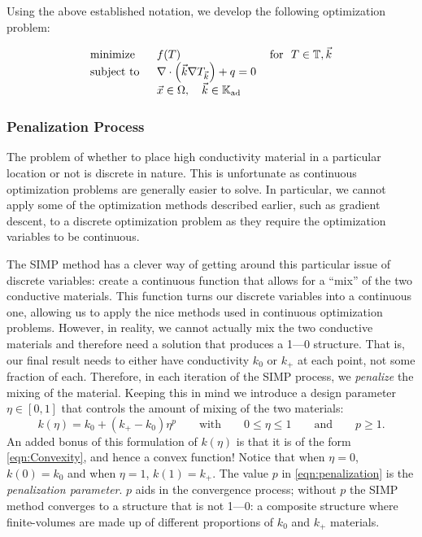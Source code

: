 Using the above established notation, we develop the following optimization problem:

\begin{equation}
	\begin{tabular}{lll}
		\text{minimize }   & $f(T)$                                                   & \text{for } $T\in\mathbb{T},\vec{k}$ \\
		\text{subject to } & $\nabla\cdot\left(\vec{k}\nabla T_{\vec{k}}\right)+q=0$  &                                      \\
		& $\vec{x}\in\Omega,\quad\vec{k}\in\mathbb{K}_{\text{ad}}$ &                                      
	\end{tabular}\label{SIMP-Optimization-Problem}
\end{equation}

\subsubsection*{Penalization Process}
The problem of whether to place high conductivity material in a particular location or not is discrete in nature. This is unfortunate as continuous optimization problems are generally easier to solve. In particular, we cannot apply some of the optimization methods described earlier, such as gradient descent, to a discrete optimization problem as they require the optimization variables to be continuous.

The SIMP method has a clever way of getting around this particular issue of discrete variables: create a continuous function that allows for a ``mix'' of the two conductive materials. This function turns our discrete variables into a continuous one, allowing us to apply the nice methods used in continuous optimization problems. However, in reality, we cannot actually mix the two conductive materials and therefore need a solution that produces a 1---0 structure. That is, our final result needs to either have conductivity $k_0$ or $k_+$ at each point, not some fraction of each. Therefore, in each iteration of the SIMP process, we \textit{penalize} the mixing of the material. Keeping this in mind we introduce a design parameter $\eta\in\left[0,1\right]$ that controls the amount of mixing of the two materials:
\begin{equation}
	k\left(\eta\right)=k_0+\left(k_+-k_0\right)\eta^p\qquad\text{with}\qquad 0\leq\eta\leq 1\qquad\text{and}\qquad p\geq1.\label{eqn:penalization}
\end{equation}
An added bonus of this formulation of $k(\eta)$ is that it is of the form \eqref{eqn:Convexity}, and hence a convex function! Notice that when $\eta=0$, $k\left(0\right)=k_0$ and when $\eta=1$, $k\left(1\right)=k_+$. The value $p$ in \eqref{eqn:penalization} is the \textit{penalization parameter}. $p$ aids in the convergence process; without $p$ the SIMP method converges to a structure that is not 1---0: a composite structure where finite-volumes are made up of different proportions of $k_0$ and $k_+$ materials.

